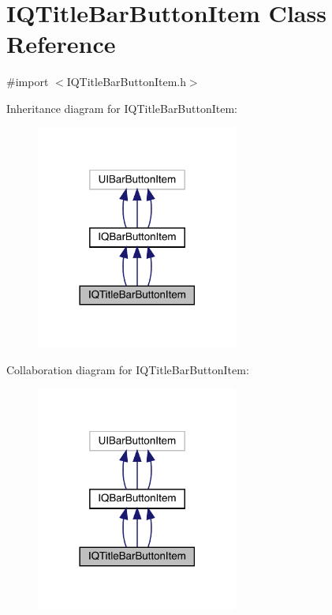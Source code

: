 \hypertarget{interface_i_q_title_bar_button_item}{}\section{I\+Q\+Title\+Bar\+Button\+Item Class Reference}
\label{interface_i_q_title_bar_button_item}


{\ttfamily \#import $<$I\+Q\+Title\+Bar\+Button\+Item.\+h$>$}



Inheritance diagram for I\+Q\+Title\+Bar\+Button\+Item\+:\nopagebreak
\begin{figure}[H]
\begin{center}
\leavevmode
\includegraphics[width=189pt]{interface_i_q_title_bar_button_item__inherit__graph}
\end{center}
\end{figure}


Collaboration diagram for I\+Q\+Title\+Bar\+Button\+Item\+:\nopagebreak
\begin{figure}[H]
\begin{center}
\leavevmode
\includegraphics[width=189pt]{interface_i_q_title_bar_button_item__coll__graph}
\end{center}
\end{figure}
